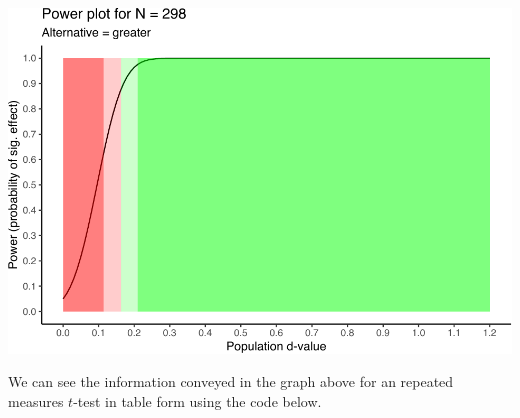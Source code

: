 \documentclass[
]{krantz}
\begin{document}
\includegraphics{bookdown_files/figure-latex/unnamed-chunk-252-1.pdf}

We can see the information conveyed in the graph above for an repeated measures \(t\)-test in table form using the code below.
\end{document}
